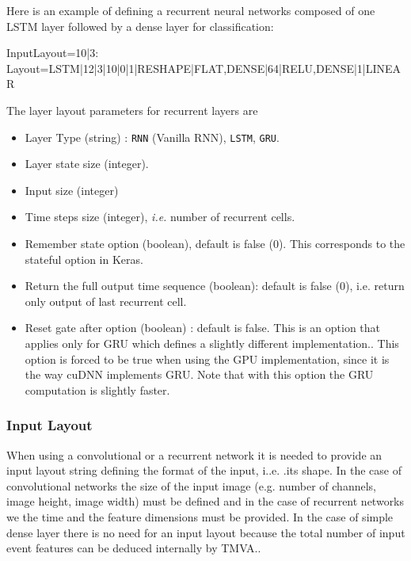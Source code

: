 {Here is an example of defining a recurrent neural networks composed of one LSTM layer followed by a dense layer for classification:

\begin{tmvacode}
  InputLayout=10|3:
  Layout=LSTM|12|3|10|0|1|RESHAPE|FLAT,DENSE|64|RELU,DENSE|1|LINEAR
\end{tmvacode}


The layer layout parameters for recurrent layers are

\begin{itemize}
 \item Layer Type (string) :  {\tt RNN} (Vanilla RNN), {\tt LSTM}, {\tt GRU}.
\item  Layer state size (integer).
\item  Input size  (integer)
\item  Time steps size  (integer), {\it i.e.} number of recurrent cells.
\item Remember state option (boolean), default is false (0). This corresponds to the stateful option in Keras.
\item Return the full output time sequence (boolean): default is false (0), i.e. return only output of last recurrent cell.
\item Reset  gate after option (boolean) : default is false. This is an option that applies only for GRU which defines a slightly different implementation..
  This option is forced to be true when using the GPU implementation, since it is the way cuDNN implements GRU. Note that with this option the GRU computation is slightly faster. 
\end{itemize}



\subsubsection{Input Layout}
\label{sec:dnn:inputlayout}


When using a convolutional or a recurrent network it is needed to provide an input layout string defining the format of the input, i..e. .its shape. In the case of convolutional networks  the size
of the input image (e.g. number of channels, image height, image width) must be defined and in the case of
recurrent networks we the time and the feature dimensions must be provided.
In the case of simple dense layer there is no need for an input layout because the total number of input event features can be deduced internally by TMVA..

}
